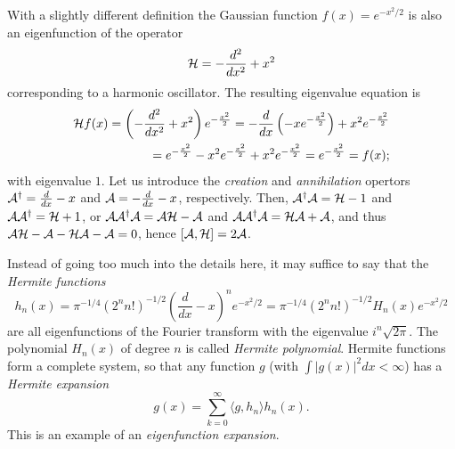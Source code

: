 With a slightly different definition the Gaussian function $f(x) = e^{-{x^2/2}}$ is also an eigenfunction of the operator
\begin{equation}
{\cal H} = - \frac{d^2}{d x^2} + x ^2
\label{2012-m-ch-fa-hphoe}
\end{equation}
corresponding to a harmonic oscillator.
The resulting eigenvalue equation is
\begin{equation}
\begin{split}
{\cal H} f(x) = \left(- \frac{d^2}{d x^2} +  x^2 \right) e^{-\frac{x^2}{2}}
=  -\frac{d }{d x }\left(-  x e^{-\frac{x^2}{2}} \right) +  x^2 e^{-\frac{x^2}{2}}  \\
=  e^{-\frac{x^2}{2}} -  x^2 e^{-\frac{x^2}{2}}  +  x^2 e^{-\frac{x^2}{2}}
= e^{-\frac{x^2}{2}}
=  f(x);
\label{2012-m-ch-fa-hphoeee}
\end{split}
\end{equation}
with eigenvalue $1$.
Let us introduce the
{\em creation}
and
{\em annihilation}
opertors
${\cal A}^\dagger =  \frac{d}{d x} -  x$
and
${\cal A}  =  - \frac{d}{d x} -  x$,
respectively.
Then,
${\cal A}^\dagger {\cal A}= {\cal H} -1$ and
${\cal A} {\cal A}^\dagger = {\cal H} +1$,
or
${\cal A}{\cal A}^\dagger {\cal A}= {\cal A}{\cal H} -{\cal A}$ and
${\cal A} {\cal A}^\dagger {\cal A}= {\cal H}{\cal A} +{\cal A}$,
and thus
$ {\cal A}{\cal H} -{\cal A} - {\cal H}{\cal A} - {\cal A} = 0$,
hence
$ [{\cal A},{\cal H}] = 2{\cal A}$.
\fi

Instead of going too much into the details here, it may suffice to say
that the
{\em Hermite functions}
\begin{equation}
h_n(x) =\pi^{-1/4}(2^n n!)^{-1/2}\left(  \frac{d}{dx} -x\right)^n e^{-{x^2/2}}
= \pi^{-1/4}(2^n n!)^{-1/2} H_n(x) e^{-{x^2/2}}
\end{equation}
are all eigenfunctions of the Fourier transform with the eigenvalue $i^n \sqrt{2\pi }$.
The polynomial $H_n(x)$ of degree $n$ is called {\em Hermite polynomial}. 
Hermite functions form a complete system, so that any function $g$ (with $\int \vert g (x) \vert^2 dx <\infty$) has a
{\em Hermite expansion}
\begin{equation}
g(x) = \sum_{k=0}^\infty \langle g , h_n\rangle h_n(x)
.
\end{equation}
This is an example of an
{\em eigenfunction expansion}.

\begin{center}
{\color{lightgray}   \Huge
\aldine
}
\end{center}
